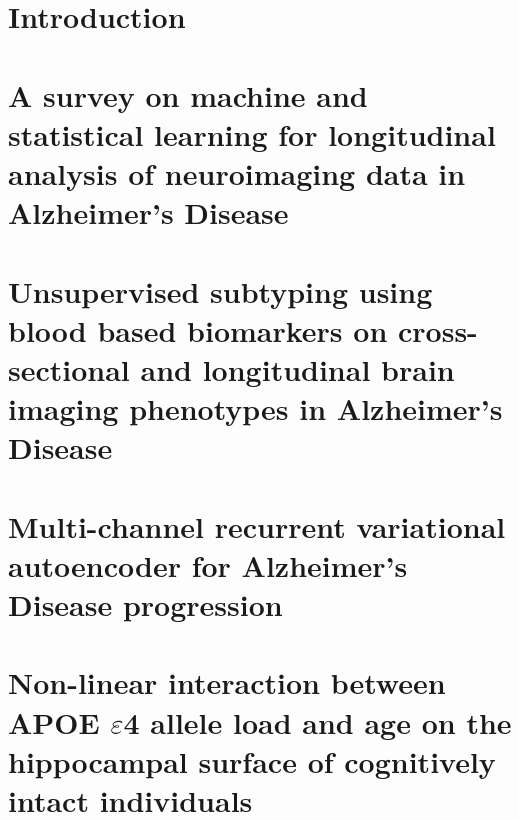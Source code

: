\documentclass[12pt, b5paper,twoside]{tesi_upf}
\begin{document}
\cleardoublepage


\tableofcontents

\listoffigures

\listoftables

\mainmatter

\chapter{Introduction} \label{ch:1-introduction}


\chapter[A survey on machine and statistical learning for longitudinal analysis of neuroimaging data in Alzheimer’s Disease]{A survey on machine and statistical learning for longitudinal analysis of neuroimaging data in Alzheimer’s Disease} \label{ch:2-review}


\chapter{Unsupervised subtyping using blood based biomarkers on cross-sectional and longitudinal brain imaging phenotypes in Alzheimer's Disease} \label{ch:3-cimlr}


\chapter{Multi-channel recurrent variational autoencoder for Alzheimer's Disease progression} \label{ch:4-rnnvae}


\chapter{Non-linear interaction between APOE $\varepsilon$4 allele load and age on the hippocampal surface of cognitively intact individuals} \label{ch:5-pmhippocampus}

\end{document}
